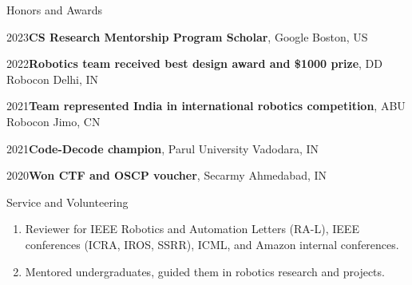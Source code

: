 \documentclass{resume}
\begin{document}





\begin{rSection}{Honors and Awards} 

{2023\hspace{1em}}{\bf CS Research Mentorship Program Scholar}{, Google} \hfill Boston, US \vspace{-0.5em}

{2022\hspace{1em}}{\bf Robotics team received best design award and \$1000 prize}{, DD Robocon} \hfill Delhi, IN \vspace{-0.5em}

{2021\hspace{1em}}{\bf Team represented India in international robotics competition}{, ABU Robocon} \hfill Jimo, CN \vspace{-0.5em}

{2021\hspace{1em}}{\bf Code-Decode champion}{, Parul University} \hfill Vadodara, IN \vspace{-0.5em}

{2020\hspace{1em}}{\bf Won CTF and OSCP voucher}{, Secarmy} \hfill Ahmedabad, IN \vspace{-0.5em}


\end{rSection}
\begin{rSection}{Service and Volunteering}
 
\begin{enumerate}
    \item Reviewer for IEEE Robotics and Automation Letters (RA-L), IEEE conferences (ICRA, IROS, SSRR), ICML, and Amazon internal conferences.
    \item Mentored undergraduates, guided them in robotics research and projects.
\end{enumerate}
\end{rSection}
\end{document}
